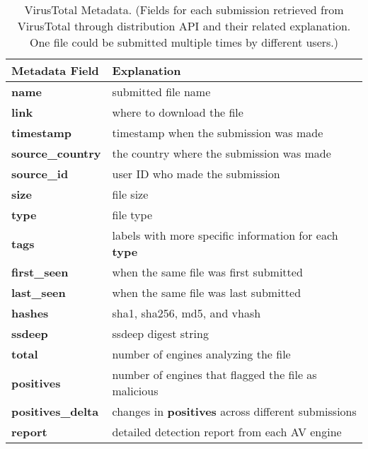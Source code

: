 
\begin{table}[h!]
\centering
\footnotesize
{
\begin{tabular}{l|l}
\hline
Metadata Field & Explanation \\
\hline                            
{\bf name}      & submitted file name \\
{\bf link}      & where to download the file \\
{\bf timestamp} & timestamp when the submission was made \\
{\bf source\_country} & the country where the submission was made \\
{\bf source\_id} & user ID who made the submission\\
{\bf size} & file size \\
{\bf type} & file type \\
{\bf tags} & labels with more specific information for each {\bf type}\\
{\bf first\_seen} & when the same file was first submitted \\
{\bf last\_seen} & when the same file was last submitted \\
{\bf hashes} & sha1, sha256, md5, and vhash\\
{\bf ssdeep} & ssdeep digest string \\
{\bf total} & number of engines analyzing the file \\
{\bf positives} & number of engines that flagged the file as malicious \\
{\bf positives\_delta} & changes in {\bf positives} across different submissions\\
{\bf report} & detailed detection report from each AV engine \\
\hline
\end{tabular}
}
\caption{VirusTotal Metadata. 
(Fields for each submission retrieved from VirusTotal through distribution API and their related explanation.
One file could be submitted multiple times by different users.)
}
\label{tab:fields}
\end{table}

